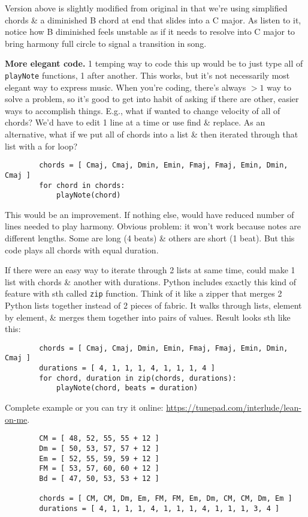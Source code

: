 \documentclass{article}
\begin{document}
\begin{itemize}
	Version above is slightly modified from original in that we're using simplified chords \& a diminished B chord at end that slides into a C major. As listen to it, notice how B diminished feels unstable as if it needs to resolve into C major to bring harmony full circle to signal a transition in song.
	
	{\bf More elegant code.} 1 temping way to code this up would be to just type all of {\tt playNote} functions, 1 after another. This works, but it's not necessarily most elegant way to express music. When you're coding, there's always $> 1$ way to solve a problem, so it's good to get into habit of asking if there are other, easier ways to accomplish things. E.g., what if wanted to change velocity of all of chords? We'd have to edit 1 line at a time or use find \& replace. As an alternative, what if we put all of chords into a list \& then iterated through that list with a for loop?
	\begin{verbatim}
		chords = [ Cmaj, Cmaj, Dmin, Emin, Fmaj, Fmaj, Emin, Dmin, Cmaj ]
		for chord in chords:
		    playNote(chord)
	\end{verbatim}
	This would be an improvement. If nothing else, would have reduced number of lines needed to play harmony. Obvious problem: it won't work because notes are different lengths. Some are long (4 beats) \& others are short (1 beat). But this code plays all chords with equal duration.
	
	If there were an easy way to iterate through 2 lists at same time, could make 1 list with chords \& another with durations. Python includes exactly this kind of feature with sth called {\tt zip} function. Think of it like a zipper that merges 2 Python lists together instead of 2 pieces of fabric. It walks through lists, element by element, \& merges them together into pairs of values. Result looks sth like this:
	\begin{verbatim}
		chords = [ Cmaj, Cmaj, Dmin, Emin, Fmaj, Fmaj, Emin, Dmin, Cmaj ]
		durations = [ 4, 1, 1, 1, 4, 1, 1, 1, 4 ]
		for chord, duration in zip(chords, durations):
		    playNote(chord, beats = duration)
	\end{verbatim}
	Complete example or you can try it online: \url{https://tunepad.com/interlude/lean-on-me}.
	\begin{verbatim}
		CM = [ 48, 52, 55, 55 + 12 ]
		Dm = [ 50, 53, 57, 57 + 12 ]
		Em = [ 52, 55, 59, 59 + 12 ]
		FM = [ 53, 57, 60, 60 + 12 ]
		Bd = [ 47, 50, 53, 53 + 12 ]
		
		chords = [ CM, CM, Dm, Em, FM, FM, Em, Dm, CM, CM, Dm, Em ]
		durations = [ 4, 1, 1, 1, 4, 1, 1, 1, 4, 1, 1, 1, 3, 4 ]
		

\end{verbatim}
\end{itemize}
\end{document}
